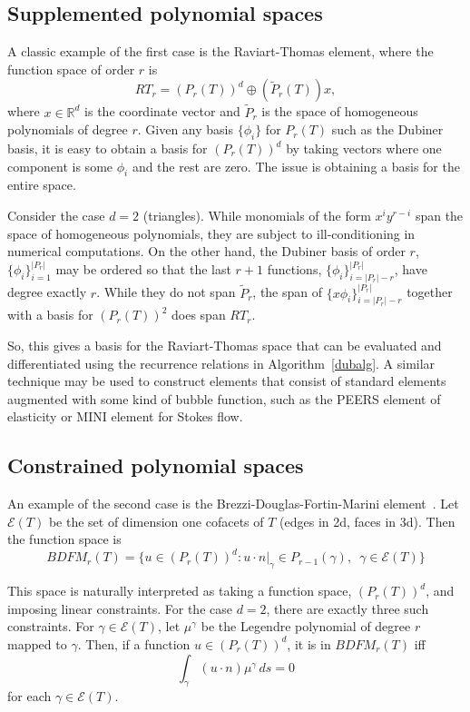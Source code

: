\subsection{Supplemented polynomial spaces}

A classic example of the first case is the Raviart-Thomas element,
where the function space of order \(r \) is
\[
RT_r = \left( P_r(T) \right)^d \oplus \left( \tilde{P}_r(T) \right) x,
\]
where \( x \in \mathbb{R}^d \) is the coordinate vector and \( \tilde{P}_r
\) is the space of homogeneous polynomials of degree \( r \).  Given any
basis \( \{ \phi_i \} \) for \( P_r(T) \) such as the Dubiner basis, it
is easy to obtain a basis for \( (P_r(T))^d \) by taking vectors where
one component is some \( \phi_i \) and the rest are zero.  The issue is
obtaining a basis for the entire space.

Consider the case \( d = 2 \) (triangles).  While monomials of the form
\( x^i y^{r-i} \) span the space of homogeneous polynomials, they are
subject to ill-conditioning in numerical computations.  On the other
hand, the Dubiner basis of order \( r \), \( \{ \phi_i \}_{i=1}^{|P_r|}
\) may be ordered so that the last \( r + 1 \) functions, \( \{ \phi_i
\}_{i=|P_r|-r}^{|P_r|} \), have degree exactly \( r \).  While they do not
span \( \tilde{P}_r \), the span of \( \{ x \phi_i \}_{i=|P_r|-r}^{|P_r|}
\) together with a basis for \( (P_r(T))^2 \) does span \( RT_r \).

So, this gives a basis for the Raviart-Thomas space that can be
evaluated and differentiated using the recurrence relations in
Algorithm~\ref{dubalg}.  A similar technique may be used to construct
elements that consist of standard elements augmented with some kind of
bubble function, such as the PEERS element of elasticity or MINI element
for Stokes flow.


\subsection{Constrained polynomial spaces}

An example of the second case is the Brezzi-Douglas-Fortin-Marini
element~\citep{BrezziFortin1991}.  Let \( \mathcal{E}(T) \) be the set of dimension
one cofacets of \( T \) (edges in 2d, faces in 3d).  Then the function
space is
\[
BDFM_r(T) = \{ u \in (P_r(T))^d : u\cdot n|_{\gamma} \in
P_{r-1}(\gamma), \, \, \, \gamma \in \mathcal{E}(T) \}
\]

This space is naturally interpreted as taking a function space, \(
(P_r(T))^d \), and imposing linear constraints.  For the case \( d =
2 \), there are exactly three such constraints.  For \( \gamma \in
\mathcal{E}(T) \), let \( \mu^\gamma \) be the Legendre polynomial of
degree \( r \) mapped to \( \gamma \).  Then, if a function \( u \in
(P_r(T))^d \), it is in \( BDFM_r(T) \) iff
\[
\int_{\gamma} ( u \cdot n ) \mu^\gamma \, ds = 0
\]
for each \( \gamma \in \mathcal{E}(T) \).

